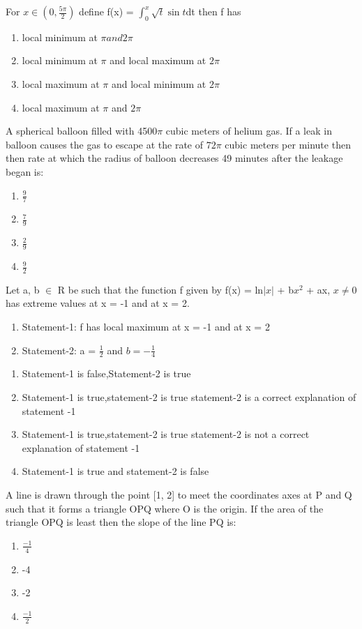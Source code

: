\item For $x \in (0, \frac{5\pi}{2})$ define f(x) = $\int_{0}^{x}\sqrt{t} \sin t$dt then f has 
\begin{enumerate}
\item local minimum at $\pi and 2\pi$
\item local minimum at $\pi$ and local maximum at $2\pi$
\item local maximum at $\pi$ and local minimum at $2\pi$
\item local maximum at $\pi$ and $2\pi$
\end{enumerate}

\item A spherical balloon filled with 4500$\pi$ cubic meters of helium gas. If a leak in balloon causes the gas to escape at the rate of $72\pi$ cubic meters per minute then then rate at which the radius of balloon  decreases 49 minutes after the leakage began is:
\begin{enumerate}
\item $\frac{9}{7}$
\item $\frac{7}{9}$
\item $\frac{2}{9}$
\item $\frac{9}{2}$
\end{enumerate}

\item Let a, b $\in$ R be such that the function f given by f(x) = ln$|x|$ + b$x^2$ + ax, $x \neq 0$ has extreme values at x = -1 and at x = 2.
\begin{enumerate}
\item Statement-1: f has local maximum at x = -1 and at x = 2
\item Statement-2: a = $\frac{1}{2}$ and $b = -\frac{1}{4}$
\end{enumerate}
\begin{enumerate}
\item Statement-1 is false,Statement-2 is true
\item Statement-1 is true,statement-2 is true statement-2 is a correct explanation of statement -1
\item Statement-1 is true,statement-2 is true statement-2 is not a correct explanation of statement -1
\item Statement-1 is true and statement-2 is false
\end{enumerate}

\item A line is drawn through the point [1, 2] to meet the coordinates axes at P and Q such that it forms a triangle OPQ where O is the origin. If the area of the triangle OPQ is least then the slope of the line PQ is:
\begin{enumerate}
\item $\frac{-1}{4}$
\item -4
\item -2
\item $\frac{-1}{2}$
\end{enumerate}

